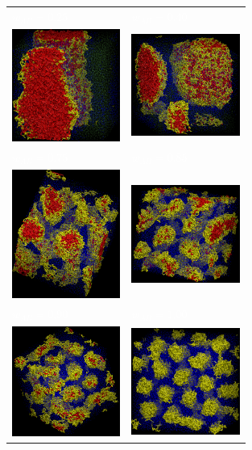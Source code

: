 \documentclass[
journal=mamobx,
manuscript=article,
]{achemso}
\begin{document}
\begin{figure}
	\centering
	\begin{tabular}{C{1.6in}@{}C{1.6in}}
		 \textcolor{white}{$w_{AB}=0.25$} & \textcolor{white}{$w_{AB}=0.40$} \\
		 \includegraphics[width=1.4in]{A3B7_025} & \includegraphics[width=1.4in]{A3B7_040} \\
		 \textcolor{white}{$w_{AB}=0.75$} & \textcolor{white}{$w_{AB}=0.85$} \\
		 \includegraphics[width=1.4in]{A3B7_075} & \includegraphics[width=1.4in]{A3B7_085} \\		
		 \textcolor{white}{$w_{AB}=0.90$} & \textcolor{white}{$w_{AB}=1.00$} \\
		 \includegraphics[width=1.4in]{A3B7_090} & \includegraphics[width=1.4in]{A3B7_100} \\		

\end{tabular}
\end{figure}
\end{document}
